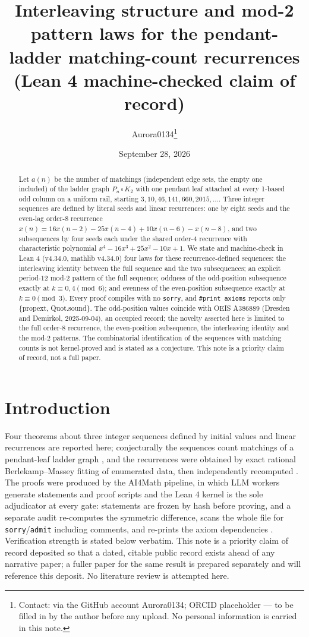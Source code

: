 \documentclass[11pt]{article}
\title{Interleaving structure and mod-2 pattern laws for the pendant-ladder
matching-count recurrences\\ (Lean 4 machine-checked claim of record)}
\author{Aurora0134\thanks{Contact: via the GitHub account Aurora0134; ORCID
placeholder --- to be filled in by the author before any upload. No personal
information is carried in this note.}}
\date{September 28, 2026}
\theoremstyle{definition}
\begin{document}
\maketitle

\begin{abstract}
Let $a(n)$ be the number of matchings (independent edge sets, the empty one
included) of the ladder graph $P_n\,\square\,K_2$ with one pendant leaf attached
at every 1-based odd column on a uniform rail, starting
$3,10,46,141,660,2015,\dots$. Three integer sequences are defined by literal
seeds and linear recurrences: one by eight seeds and the even-lag order-$8$
recurrence $x(n)=16x(n-2)-25x(n-4)+10x(n-6)-x(n-8)$, and two subsequences by
four seeds each under the shared order-$4$ recurrence with characteristic
polynomial $x^4-16x^3+25x^2-10x+1$. We state and machine-check in Lean 4
(v4.34.0, mathlib v4.34.0) four laws for these recurrence-defined sequences:
the interleaving identity between the full sequence and the two subsequences;
an explicit period-$12$ mod-$2$ pattern of the full sequence; oddness of the
odd-position subsequence exactly at $k\equiv 0,4\pmod 6$; and evenness of the
even-position subsequence exactly at $k\equiv 0\pmod 3$. Every proof compiles
with no \texttt{sorry}, and \texttt{\#print axioms} reports only \{propext,
Quot.sound\}. The odd-position values coincide with OEIS A386889 (Dresden and
Demirkol, 2025-09-04), an occupied record; the novelty asserted here is limited
to the full order-$8$ recurrence, the even-position subsequence, the
interleaving identity and the mod-$2$ patterns. The combinatorial
identification of the sequences with matching counts is not kernel-proved and
is stated as a conjecture. This note is a priority claim of record, not a full
paper.
\end{abstract}

\section{Introduction}

Four theorems about three integer sequences defined by initial values and linear
recurrences are reported here; conjecturally the sequences count matchings of a
pendant-leaf ladder graph \cite{godsil-gutman}, and the recurrences were
obtained by exact rational Berlekamp--Massey fitting of enumerated data, then
independently recomputed \cite{massey}. The proofs were produced by the AI4Math
pipeline, in which LLM workers generate statements and proof scripts and the
Lean 4 kernel is the sole adjudicator at every gate: statements are frozen by
hash before proving, and a separate audit re-computes the symmetric difference,
scans the whole file for \texttt{sorry}/\texttt{admit} including comments, and
re-prints the axiom dependencies \cite{lean4,mathlib}. Verification strength is
stated below verbatim. This note is a priority claim of record deposited so that
a dated, citable public record exists ahead of any narrative paper; a fuller
paper for the same result is prepared separately and will reference this
deposit. No literature review is attempted here.
\end{document}
